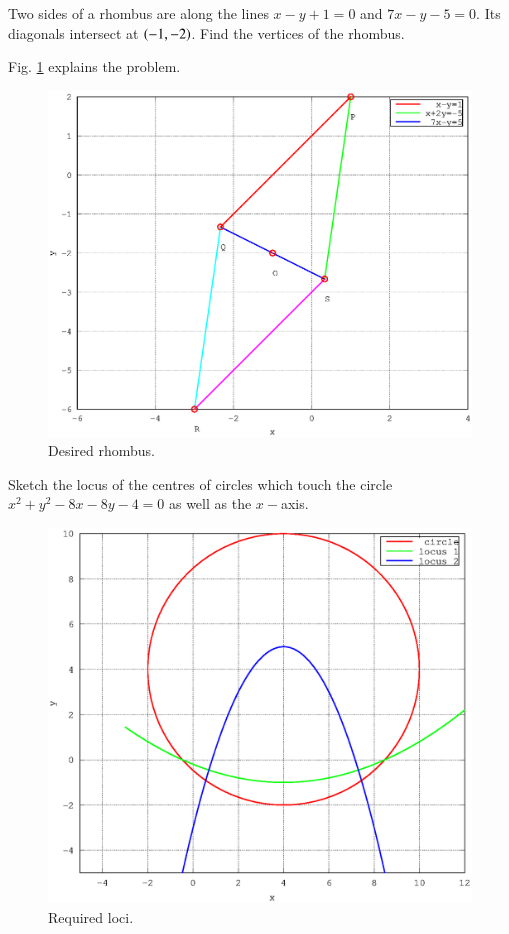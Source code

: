 \documentclass[journal,12pt,twocolumn]{IEEEtran}
\begin{document}
%
\begin{problem}
Two sides of a rhombus are along the lines $x-y+1 = 0$ and $7x-y-5=0$. Its diagonals intersect at $\left(-1,-2\right)$. Find the vertices of the rhombus.
\end{problem}
\solution

Fig. \ref{fig_34} explains the problem.

%
\begin{figure}[h]
\centering
\includegraphics[width=\columnwidth]{./figs/ee16b1034}
\caption{ Desired rhombus.}
\label{fig_34}	
\end{figure}
%
\begin{problem}
Sketch the locus of the centres of circles which touch the circle $x^2+y^2-8x-8y-4=0$ as well as the $x-$axis. 
\end{problem}
\solution


%
\begin{figure}[h]
\centering
\includegraphics[width=\columnwidth]{./figs/ee16b1035}
\caption{ Required loci.}
\label{fig_35}	
\end{figure}
\end{document}
